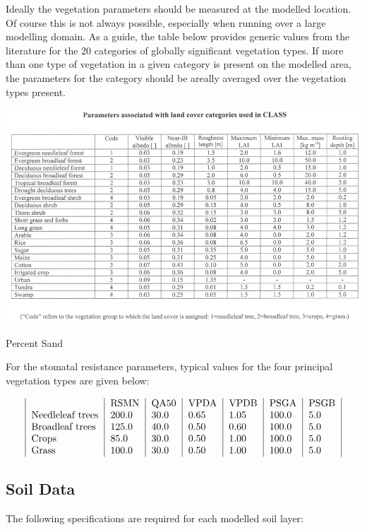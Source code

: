 Ideally the vegetation parameters should be measured at the modelled location. Of course this is not always possible, especially when running over a large modelling domain. As a guide, the table below provides generic values from the literature for the 20 categories of globally significant vegetation types. If more than one type of vegetation in a given category is present on the modelled area, the parameters for the category should be areally averaged over the vegetation types present.


\begin{DoxyImage}
\includegraphics[width=\textwidth,height=\textheight/2,keepaspectratio=true]{landcovercat_table.png}
\caption{Percent Sand}
\end{DoxyImage}
 For the stomatal resistance parameters, typical values for the four principal vegetation types are given below\+:

\[ \begin{tabular}{ | l | l | l | l | l | l | l | } & RSMN & QA50 & VPDA & VPDB & PSGA & PSGB \\ Needleleaf trees & 200.0 & 30.0 & 0.65 & 1.05 & 100.0 & 5.0 \\ Broadleaf trees & 125.0 & 40.0 & 0.50 & 0.60 & 100.0 & 5.0 \\ Crops & 85.0 & 30.0 & 0.50 & 1.00 & 100.0 & 5.0 \\ Grass & 100.0 & 30.0 & 0.50 & 1.00 & 100.0 & 5.0 \\ \end{tabular} \]\hypertarget{index_soilData}{}\subsection{Soil Data}\label{index_soilData}
The following specifications are required for each modelled soil layer\+:


